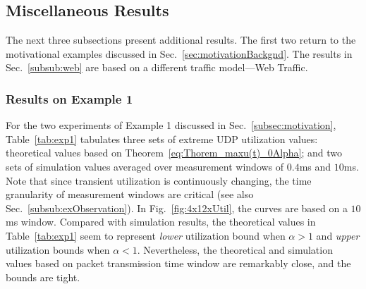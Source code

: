\documentclass{IEEEtran}
\begin{document}
    \subsection{Miscellaneous Results}\label{subsec:furtherResults}

     The next three subsections present additional results. The first two return to the motivational examples discussed in Sec.~\ref{sec:motivationBackgnd}. The results in Sec.~\ref{subsub:web} are based on a different traffic model---Web Traffic.

    \subsubsection{Results on Example 1}
For the two experiments of Example 1 discussed in Sec.~\ref{subsec:motivation}, Table~\ref{tab:exp1} tabulates three sets of extreme UDP utilization values:  theoretical values based on Theorem~\ref{eq:Thorem_maxu(t)_0Alpha};  and two sets of simulation values averaged over measurement windows of $0.4$ms and $10$ms. Note that since transient utilization is continuously changing, the time granularity of measurement windows are critical (see also Sec.~\ref{subsub:exObservation}). In Fig.~\ref{fig:4x12xUtil}, the curves are based on a $10$ms window. Compared with simulation results,  the theoretical values in Table~\ref{tab:exp1} seem to represent \emph{lower} utilization bound when  $\alpha>1$ and \emph{upper} utilization bounds when $\alpha<1$. Nevertheless, the theoretical and simulation values based on packet transmission time window are remarkably close, and the bounds are tight. 
\end{document}
